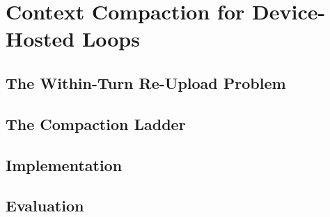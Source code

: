 \chapter{Context Compaction for Device-Hosted Loops}
\label{ch:compaction}

\section{The Within-Turn Re-Upload Problem}
\label{sec:comp-problem}

\section{The Compaction Ladder}
\label{sec:comp-ladder}

\section{Implementation}
\label{sec:comp-impl}

\section{Evaluation}
\label{sec:comp-eval}

